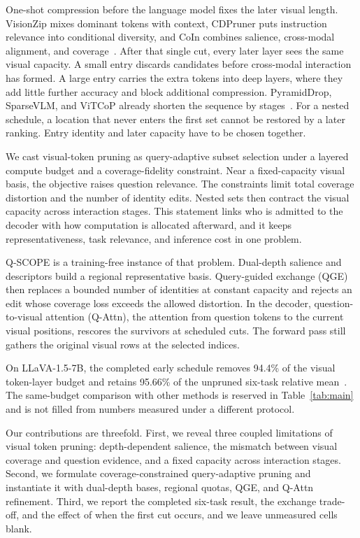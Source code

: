 One-shot compression before the language model fixes the later visual length. VisionZip mixes dominant tokens with context, CDPruner puts instruction relevance into conditional diversity, and CoIn combines salience, cross-modal alignment, and coverage~\cite{visionzip,cdpruner,coin}. After that single cut, every later layer sees the same visual capacity. A small entry discards candidates before cross-modal interaction has formed. A large entry carries the extra tokens into deep layers, where they add little further accuracy and block additional compression. PyramidDrop, SparseVLM, and ViTCoP already shorten the sequence by stages~\cite{pyramiddrop,vitcop}. For a nested schedule, a location that never enters the first set cannot be restored by a later ranking. Entry identity and later capacity have to be chosen together.

We cast visual-token pruning as query-adaptive subset selection under a layered compute budget and a coverage-fidelity constraint. Near a fixed-capacity visual basis, the objective raises question relevance. The constraints limit total coverage distortion and the number of identity edits. Nested sets then contract the visual capacity across interaction stages. This statement links who is admitted to the decoder with how computation is allocated afterward, and it keeps representativeness, task relevance, and inference cost in one problem.

Q-SCOPE is a training-free instance of that problem. Dual-depth salience and descriptors build a regional representative basis. Query-guided exchange (QGE) then replaces a bounded number of identities at constant capacity and rejects an edit whose coverage loss exceeds the allowed distortion. In the decoder, question-to-visual attention (Q-Attn), the attention from question tokens to the current visual positions, rescores the survivors at scheduled cuts. The forward pass still gathers the original visual rows at the selected indices.

On LLaVA-1.5-7B, the completed early schedule removes 94.4\% of the visual token-layer budget and retains 95.66\% of the unpruned six-task relative mean~\cite{llava15}. The same-budget comparison with other methods is reserved in Table~\ref{tab:main} and is not filled from numbers measured under a different protocol.

Our contributions are threefold. First, we reveal three coupled limitations of visual token pruning: depth-dependent salience, the mismatch between visual coverage and question evidence, and a fixed capacity across interaction stages. Second, we formulate coverage-constrained query-adaptive pruning and instantiate it with dual-depth bases, regional quotas, QGE, and Q-Attn refinement. Third, we report the completed six-task result, the exchange trade-off, and the effect of when the first cut occurs, and we leave unmeasured cells blank.
